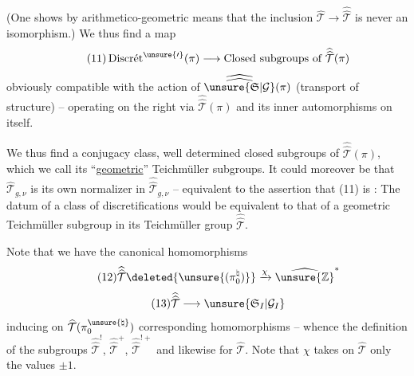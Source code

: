 

(One shows by arithmetico-geometric means that the inclusion
$\widehat{\mathcal{T}}\longrightarrow\widehat{\widehat{\mathcal{T}}}$
is never an isomorphism.) We thus find a map
\[
\tag{11}
\operatorname{Discr\acute{e}t}^{\unsure{\prime}}(\pi)\longrightarrow
\text{Closed subgroups of }\widehat{\widehat{\mathcal{T}}}(\pi)
\]
obviously compatible with the action of
$\widehat{\widehat{\unsure{\mathfrak{S}|\mathcal{G}}}}(\pi)$ (transport of structure) -- operating
on the right via $\widehat{\widehat{\mathcal{T}}}(\pi)$ and its inner automorphisms on itself.

We thus find a conjugacy class, well determined 
closed subgroups of $\widehat{\widehat{\mathcal{T}}}(\pi)$,
which we call its ``\uline{geometric}'' Teichmüller subgroups.
It could moreover be that $\widehat{\mathcal{T}}_{g,\nu}$ is
its own normalizer in $\widehat{\widehat{\mathcal{T}}}_{g,\nu}$
-- equivalent to the assertion that (11) is  :
The datum of a class of discretifications
would be equivalent to that of a geometric Teichmüller subgroup in
its  Teichmüller group $\widehat{\widehat{\mathcal{T}}}$.




Note that we have the canonical homomorphisms
\[
\tag{12}
\widehat{\widehat{\mathcal{T}}}\deleted{\unsure{(\pi_0^{\natural})}}
\xrightarrow{\chi}\widehat{\unsure{\mathbb{Z}}}^{*}
\]
\[
\tag{13}
\widehat{\widehat{\mathcal{T}}}\longrightarrow
\unsure{\mathfrak{S}_{I}|\mathcal{G}_{I}}
\]
inducing on $\widehat{\mathcal{T}}(\pi_0^{\unsure{\natural}})$
 corresponding homomorphisms -- whence the definition of the
subgroups $\widehat{\widehat{\mathcal{T}}}^{!}$,
$\widehat{\widehat{\mathcal{T}}}^{+}$,
$\widehat{\widehat{\mathcal{T}}}^{!+}$ and likewise for
$\widehat{\mathcal{T}}$. Note that $\chi$ takes on $\widehat{\mathcal{T}}$
only the values $\pm1$.

